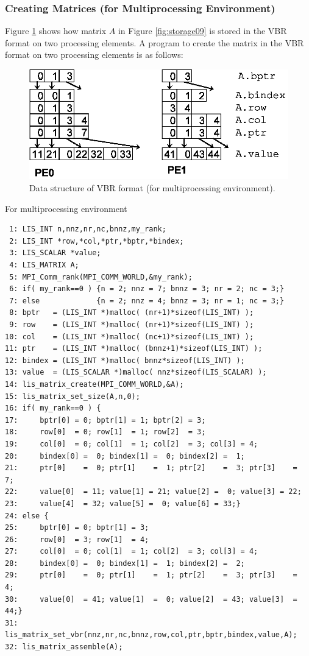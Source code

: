 \documentclass[a4paper]{article}
\begin{document}
\subsubsection{Creating Matrices (for Multiprocessing Environment)}
Figure \ref{fig:storage09_mpi} shows how matrix $A$ in Figure \ref{fig:storage09} is stored in the VBR format on two processing elements. A program to create the matrix in the VBR format on two processing elements is as follows:
\begin{figure}[h]
{\centering 
\includegraphics{storage09_mpi.eps} 
\caption{Data structure of VBR format (for multiprocessing environment).}\label{fig:storage09_mpi}}
\end{figure}
\begin{itemsquarebox}[l]{For multiprocessing environment}
\small
\begin{verbatim}
 1: LIS_INT n,nnz,nr,nc,bnnz,my_rank;
 2: LIS_INT *row,*col,*ptr,*bptr,*bindex;
 3: LIS_SCALAR *value;
 4: LIS_MATRIX A;
 5: MPI_Comm_rank(MPI_COMM_WORLD,&my_rank);
 6: if( my_rank==0 ) {n = 2; nnz = 7; bnnz = 3; nr = 2; nc = 3;}
 7: else             {n = 2; nnz = 4; bnnz = 3; nr = 1; nc = 3;}
 8: bptr   = (LIS_INT *)malloc( (nr+1)*sizeof(LIS_INT) );
 9: row    = (LIS_INT *)malloc( (nr+1)*sizeof(LIS_INT) );
10: col    = (LIS_INT *)malloc( (nc+1)*sizeof(LIS_INT) );
11: ptr    = (LIS_INT *)malloc( (bnnz+1)*sizeof(LIS_INT) );
12: bindex = (LIS_INT *)malloc( bnnz*sizeof(LIS_INT) );
13: value  = (LIS_SCALAR *)malloc( nnz*sizeof(LIS_SCALAR) );
14: lis_matrix_create(MPI_COMM_WORLD,&A);
15: lis_matrix_set_size(A,n,0);
16: if( my_rank==0 ) {
17:     bptr[0] = 0; bptr[1] = 1; bptr[2] = 3;
18:     row[0]  = 0; row[1]  = 1; row[2]  = 3;
19:     col[0]  = 0; col[1]  = 1; col[2]  = 3; col[3] = 4;
20:     bindex[0] =  0; bindex[1] =  0; bindex[2] =  1;
21:     ptr[0]    =  0; ptr[1]    =  1; ptr[2]    =  3; ptr[3]    =  7;
22:     value[0]  = 11; value[1] = 21; value[2] =  0; value[3] = 22;
23:     value[4]  = 32; value[5] =  0; value[6] = 33;}
24: else {
25:     bptr[0] = 0; bptr[1] = 3;
26:     row[0]  = 3; row[1]  = 4;
27:     col[0]  = 0; col[1]  = 1; col[2]  = 3; col[3] = 4;
28:     bindex[0] =  0; bindex[1] =  1; bindex[2] =  2;
29:     ptr[0]    =  0; ptr[1]    =  1; ptr[2]    =  3; ptr[3]    =  4;
30:     value[0]  = 41; value[1]  =  0; value[2]  = 43; value[3]  = 44;}
31: lis_matrix_set_vbr(nnz,nr,nc,bnnz,row,col,ptr,bptr,bindex,value,A);
32: lis_matrix_assemble(A);
\end{verbatim}
\end{itemsquarebox}
\end{document}
